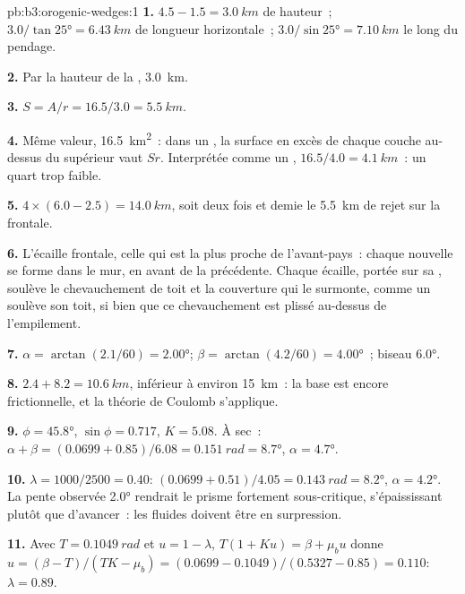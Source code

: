 \begin{solution}{pb:b3:orogenic-wedges:1}
\textbf{1.} $4.5 - 1.5 = \qty{3.0}{km}$ de hauteur~; $3.0/\tan\ang{25} =
\qty{6.43}{km}$ de longueur horizontale~; $3.0/\sin\ang{25} = \qty{7.10}{km}$ le long
du pendage.

\textbf{2.} Par la hauteur de la , \qty{3.0}{km}.

\textbf{3.} $S = A/r = 16.5/3.0 = \qty{5.5}{km}$.

\textbf{4.} Même valeur, \qty{16.5}{km^2}~: dans un , la surface en excès
de chaque couche au-dessus du  supérieur vaut $Sr$. Interprétée comme un , $16.5/4.0 =
\qty{4.1}{km}$~: un quart trop faible.

\textbf{5.} $4\times(6.0 - 2.5) = \qty{14.0}{km}$, soit deux fois et demie le
\qty{5.5}{km} de rejet sur la  frontale.

\textbf{6.} L'écaille frontale, celle qui est la plus proche de l'avant-pays~: chaque nouvelle 
se forme dans le mur, en avant de la précédente. Chaque écaille, portée sur sa ,
soulève le chevauchement de toit et la couverture qui le surmonte, comme un  soulève son
toit, si bien que ce chevauchement est plissé au-dessus de l'empilement.

\textbf{7.} $\alpha = \arctan(2.1/60) = \ang{2.00}$; $\beta =
\arctan(4.2/60) = \ang{4.00}$~; biseau \ang{6.0}.

\textbf{8.} $2.4 + 8.2 = \qty{10.6}{km}$, inférieur à environ \qty{15}{km}~: la
base est encore frictionnelle, et la théorie de Coulomb s'applique.

\textbf{9.} $\phi = \ang{45.8}$, $\sin\phi = 0.717$, $K = 5.08$. À sec~:
$\alpha + \beta = (0.0699 + 0.85)/6.08 = \qty{0.151}{rad} = \ang{8.7}$,
$\alpha = \ang{4.7}$.

\textbf{10.} $\lambda = 1000/2500 = 0.40$: $(0.0699 + 0.51)/4.05 =
\qty{0.143}{rad} = \ang{8.2}$, $\alpha = \ang{4.2}$. La pente observée \ang{2.0}
rendrait le prisme fortement sous-critique, s'épaississant plutôt que d'avancer~:
les fluides doivent être en surpression.

\textbf{11.} Avec $T = \qty{0.1049}{rad}$ et $u = 1 - \lambda$, $T(1 + Ku) =
\beta + \mu_bu$ donne $u = (\beta - T)/(TK - \mu_b) = (0.0699 -
0.1049)/(0.5327 - 0.85) = 0.110$: $\lambda = 0.89$.


\end{solution}
